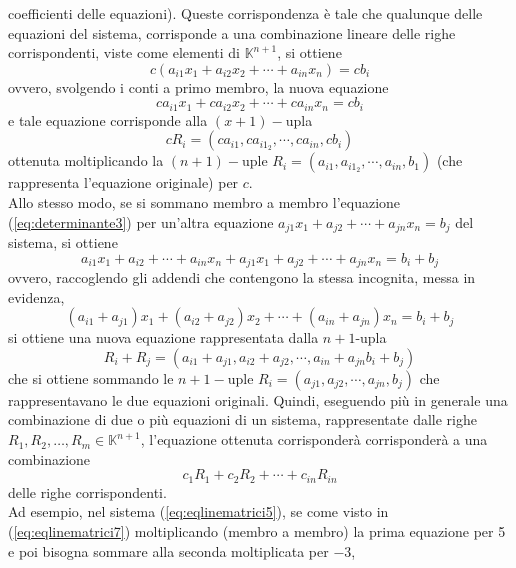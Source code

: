 \documentclass{book}
\theoremstyle{definition}
\theoremstyle{plain}
\begin{document}
coefficienti delle equazioni). Queste corrispondenza è tale che qualunque
delle equazioni del sistema, corrisponde a una combinazione lineare delle
righe corrispondenti, viste come elementi di $\mathds{K}^{n+1}$, si
ottiene
\begin{equation*}
  c(a_{i1}x_1+a_{i2}x_2+\cdots+a_{in}x_n)=cb_{i}
\end{equation*}
ovvero, svolgendo i conti a primo membro, la nuova equazione
\begin{equation*}
  ca_{i1}x_1+ca_{i2}x_2+\cdots+ca_{in}x_n=cb_i
\end{equation*}
e tale equazione corrisponde alla $(x+1)-$upla
\begin{equation*}
  cR_i=(ca_{i1},ca_{i1_2},\cdots,ca_{in},cb_i)
\end{equation*}
ottenuta moltiplicando la $(n+1)-$uple
$R_i=(a_{i1},a_{i1_2},\cdots,a_{in},b_1)$ (che rappresenta l'equazione
originale) per $c$.\\
Allo stesso modo, se si sommano membro a membro l'equazione
(\ref{eq:determinante3}) per un'altra equazione
$a_{j1}x_1+a_{j2}+\cdots+a_{jn}x_{n}=b_j$ del sistema, si ottiene
\begin{equation*}
  a_{i1}x_1+a_{i2}+\cdots+a_{in}x_{n}+a_{j1}x_1+a_{j2}+\cdots+a_{jn}x_{n}
  =b_i+b_j
\end{equation*}
ovvero, raccoglendo gli addendi che contengono la stessa incognita, messa
in evidenza,
\begin{equation*}
  (a_{i1}+a_{j1})x_1+(a_{i2}+a_{j2})x_2+\cdots+(a_{in}+a_{jn})x_n=b_i+b_j
\end{equation*}
si ottiene una nuova equazione rappresentata dalla $n+1$-upla
\begin{equation*}
  R_i+R_j=(a_{i1}+a_{j1},a_{i2}+a_{j2},\cdots,a_{in}+a_{jn}b_i+b_j)
\end{equation*}
che si ottiene sommando le $n+1-$uple
$R_i=(a_{j1},a_{j2},\cdots,a_{jn},b_j)$ che rappresentavano le due
equazioni originali. Quindi, eseguendo più in generale una combinazione di
due o più equazioni di un sistema, rappresentate dalle righe
$R_1,R_2,\dots,R_m\in \mathds{K}^{n+1}$, l'equazione ottenuta
corrisponderà corrisponderà a una combinazione
\begin{equation*}
  c_1R_1+c_2R_2+\cdots+c_{in}R_{in}
\end{equation*}
delle righe corrispondenti.\\
Ad esempio, nel sistema (\ref{eq:eqlinematrici5}), se come visto in
(\ref{eq:eqlinematrici7}) moltiplicando (membro a membro) la prima
equazione per 5 e poi bisogna sommare alla seconda moltiplicata per $-3$,
\end{document}
